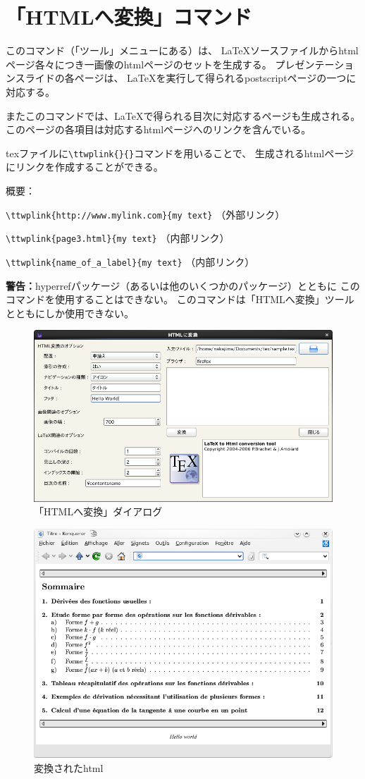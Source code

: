 \section{「HTMLへ変換」コマンド}

このコマンド（「ツール」メニューにある）は、
LaTeXソースファイルからhtmlページ各々につき一画像のhtmlページのセットを生成する。
プレゼンテーションスライドの各ページは、
LaTeXを実行して得られるpostscriptページの一つに対応する。

またこのコマンドでは、LaTeXで得られる目次に対応するページも生成される。
このページの各項目は対応するhtmlページへのリンクを含んでいる。

texファイルに\verb+\ttwplink{}{}+コマンドを用いることで、
生成されるhtmlページにリンクを作成することができる。

概要：

\verb+\ttwplink{http://www.mylink.com}{my text}+ （外部リンク）

\verb+\ttwplink{page3.html}{my text}+ （内部リンク）

\verb+\ttwplink{name_of_a_label}{my text}+ （内部リンク）

\textbf{警告：}hyperrefパッケージ（あるいは他のいくつかのパッケージ）とともに
このコマンドを使用することはできない。
このコマンドは「HTMLへ変換」ツールとともにしか使用できない。

\begin{figure}[H]
  \centering
  \includegraphics[width=.8\linewidth]{doc18.png}
  \caption{「HTMLへ変換」ダイアログ}
\end{figure}

\begin{figure}[H]
  \centering
  \includegraphics[width=.8\linewidth]{doc19.png}
  \caption{変換されたhtml}
\end{figure}

